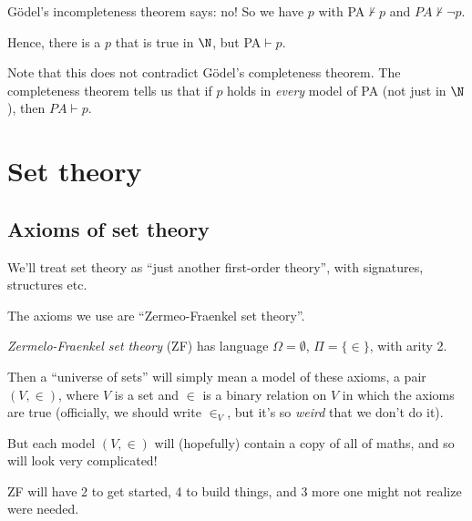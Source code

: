 \documentclass[a4paper]{article}
\begin{document}
G\"odel's incompleteness theorem says: no! So we have $p$ with PA$\not\vdash p$ and $PA\not\vdash \neg p$.

Hence, there is a $p$ that is true in $\N$, but PA$\vdash p$.

Note that this does not contradict G\"odel's completeness theorem. The completeness theorem tells us that if $p$ holds in \emph{every} model of PA (not just in $\N$), then $PA\vdash p$.

\section{Set theory}
\subsection{Axioms of set theory}
We'll treat set theory as ``just another first-order theory'', with signatures, structures etc.

The axioms we use are ``Zermeo-Fraenkel set theory''.
\begin{defi}
  \emph{Zermelo-Fraenkel set theory} (ZF) has language $\Omega = \emptyset$, $\Pi = \{\in\}$, with arity 2.
\end{defi}
Then a ``universe of sets'' will simply mean a model of these axioms, a pair $(V, \in)$, where $V$ is a set and $\in$ is a binary relation on $V$ in which the axioms are true (officially, we should write $\in_V$, but it's so \emph{weird} that we don't do it).

But each model $(V, \in)$ will (hopefully) contain a copy of all of maths, and so will look very complicated!

ZF will have 2 to get started, 4 to build things, and 3 more one might not realize were needed.
\end{document}
